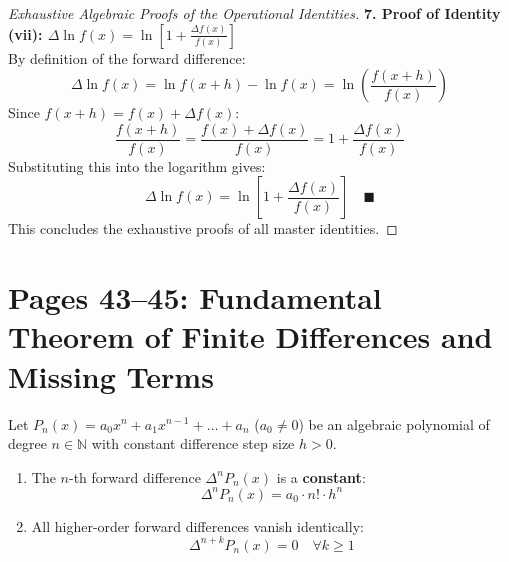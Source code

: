 \begin{proof}[Exhaustive Algebraic Proofs of the Operational Identities]
\medskip
\noindent\textbf{7. Proof of Identity (vii): $\Delta \ln f(x) = \ln\left[ 1 + \frac{\Delta f(x)}{f(x)} \right]$} \\
By definition of the forward difference:
\begin{equation}
    \Delta \ln f(x) = \ln f(x + h) - \ln f(x) = \ln\left( \frac{f(x + h)}{f(x)} \right)
\end{equation}
Since $f(x + h) = f(x) + \Delta f(x)$:
\begin{equation}
    \frac{f(x + h)}{f(x)} = \frac{f(x) + \Delta f(x)}{f(x)} = 1 + \frac{\Delta f(x)}{f(x)}
\end{equation}
Substituting this into the logarithm gives:
\begin{equation}
    \boxed{\Delta \ln f(x) = \ln\left[ 1 + \frac{\Delta f(x)}{f(x)} \right]} \quad \blacksquare
\end{equation}
This concludes the exhaustive proofs of all master identities.
\end{proof}

\section{Pages 43--45: Fundamental Theorem of Finite Differences and Missing Terms}
\label{sec:fundamental_theorem_differences}

\begin{theorembox}
Let $P_n(x) = a_0 x^n + a_1 x^{n-1} + \dots + a_n$ ($a_0 \ne 0$) be an algebraic polynomial of degree $n \in \mathbb{N}$ with constant difference step size $h > 0$.
\begin{enumerate}
    \item The $n$-th forward difference $\Delta^n P_n(x)$ is a \textbf{constant}:
    \begin{equation}
        \boxed{\Delta^n P_n(x) = a_0 \cdot n! \cdot h^n}
    \end{equation}
    \item All higher-order forward differences vanish identically:
    \begin{equation}
        \boxed{\Delta^{n+k} P_n(x) = 0 \quad \forall k \ge 1}
    \end{equation}
\end{enumerate}
\end{theorembox}

